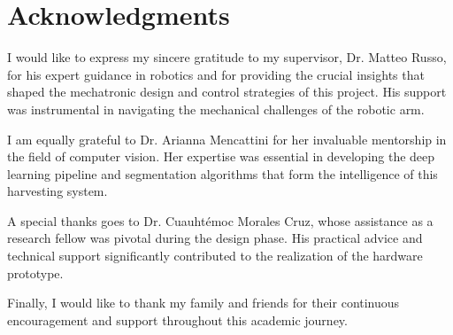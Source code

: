  \chapter*{\textbf{Acknowledgments}}

I would like to express my sincere gratitude to my supervisor, Dr. Matteo Russo, for his expert guidance in robotics and for providing the crucial insights that shaped the mechatronic design and control strategies of this project. His support was instrumental in navigating the mechanical challenges of the robotic arm.

I am equally grateful to Dr. Arianna Mencattini for her invaluable mentorship in the field of computer vision. Her expertise was essential in developing the deep learning pipeline and segmentation algorithms that form the intelligence of this harvesting system.

A special thanks goes to Dr. Cuauhtémoc Morales Cruz, whose assistance as a research fellow was pivotal during the design phase. His practical advice and technical support significantly contributed to the realization of the hardware prototype.

Finally, I would like to thank my family and friends for their continuous encouragement and support throughout this academic journey.
